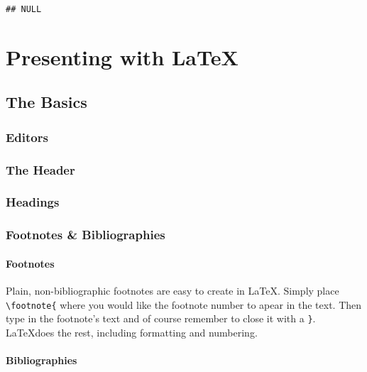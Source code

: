 \documentclass[ChapterTOCs,krantz1]{krantz}\usepackage{graphicx, color}
\makeatletter
\newenvironment{kframe}{%
 \def\at@end@of@kframe{}%
 \ifinner\ifhmode%
  \def\at@end@of@kframe{\end{minipage}}%
  \begin{minipage}{\columnwidth}%
 \fi\fi%
 \def\FrameCommand##1{\hskip\@totalleftmargin \hskip-\fboxsep
 \colorbox{shadecolor}{##1}\hskip-\fboxsep
     \hskip-\linewidth \hskip-\@totalleftmargin \hskip\columnwidth}%
 \MakeFramed {\advance\hsize-\width
   \@totalleftmargin\z@ \linewidth\hsize
   \@setminipage}}%
 {\par\unskip\endMakeFramed%
 \at@end@of@kframe}
\newenvironment{knitrout}{}{} %
\makeatother
\begin{document}

\begin{knitrout}
\color{fgcolor}\begin{kframe}
\begin{verbatim}
## NULL
\end{verbatim}
\end{kframe}
\end{knitrout}


\chapter{Presenting with \LaTeX}

\section{The Basics}

\subsection{Editors}

\subsection{The Header}

\subsection{Headings}

\subsection{Footnotes \& Bibliographies}

\subsubsection{Footnotes}

Plain, non-bibliographic footnotes are easy to create in \LaTeX. Simply
place \texttt{\textbackslash{}footnote\{} where you would like the
footnote number to apear in the text. Then type in the footnote's text
and of course remember to close it with a \texttt{\}}. \LaTeX does the
rest, including formatting and numbering.

\subsubsection{Bibliographies}
\end{document}
